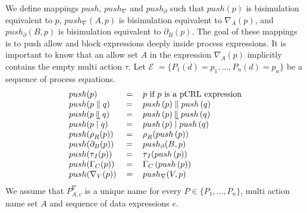 \documentclass{article}
\providecommand{\leftmerge}{\mathbin{\mathrel{\llfloor}}}
\begin{document}
We define mappings $push$, $push_{\nabla }$ and $push_{\partial }$ such that
$push(p)$ is bisimulation equivalent to $p$, $push_{\nabla }(A,p)$ is
bisimulation equivalent to $\nabla _{A}(p)$, and $push_{\partial }(B,p)$ is
bisimulation equivalent to $\partial _{B}(p)$. The goal of these mappings is
to push allow and block expressions deeply inside process expressions. It is
important to know that an allow set $A$ in the expression $\nabla _{A}(p)$
implicitly contains the empty multi action $\tau $. Let $\mathcal{E}$ $%
=\{P_{1}(d)=p_{1},\ldots ,P_{n}(d)=p_{n}\}$ be a sequence of process
equations.%
\[
\begin{tabular}{lll}
$push(p)$ & $=$ & $p$ if $p$ is a pCRL expression \\
$push(p\parallel q)$ & $=$ & $push\left( p\right) \parallel push\left(
q\right) $ \\
$push(p\leftmerge q)$ & $=$ & $push\left( p\right) \leftmerge push\left(
q\right) $ \\
$push(p\mid q)$ & $=$ & $push\left( p\right) \mid push\left( q\right) $ \\
$push(\rho _{R}(p))$ & $=$ & $\rho _{R}(push\left( p\right) )$ \\
$push(\partial _{B}(p))$ & $=$ & $push_{\partial }(B,p)$ \\
$push(\tau _{I}(p))$ & $=$ & $\tau _{I}(push\left( p\right) )$ \\
$push(\Gamma _{C}(p))$ & $=$ & $\Gamma _{C}\left( push\left( p\right)
\right) $ \\
$push(\nabla _{V}(p))$ & $=$ & $push_{\nabla }(V,p)$%
\end{tabular}%
\]%
We assume that $P_{A,e}^{\nabla }$ is a unique name for every $P\in
\{P_{1},\ldots ,P_{n}\}$, multi action name set $A$ and sequence of data
expressions $e$.%
\end{document}
